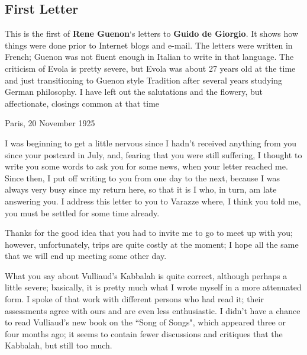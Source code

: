 \subsection{First Letter}

\begin{quotex}
This is the first of \textbf{Rene Guenon}`s letters to \textbf{Guido de Giorgio}. It shows how things were done prior to Internet blogs and e-mail. The letters were written in French; Guenon was not fluent enough in Italian to write in that language. The criticism of Evola is pretty severe, but Evola was about 27 years old at the time and just transitioning to Guenon style Tradition after several years studying German philosophy. I have left out the salutations and the flowery, but affectionate, closings common at that time
\end{quotex}

Paris, 20 November 1925

I was beginning to get a little nervous since I hadn't received anything from you since your postcard in July, and, fearing that you were still suffering, I thought to write you some words to ask you for some news, when your letter reached me. Since then, I put off writing to you from one day to the next, because I was always very busy since my return here, so that it is I who, in turn, am late answering you. I address this letter to you to Varazze where, I think you told me, you must be settled for some time already.

Thanks for the good idea that you had to invite me to go to meet up with you; however, unfortunately, trips are quite costly at the moment; I hope all the same that we will end up meeting some other day.

What you say about Vulliaud's Kabbalah is quite correct, although perhaps a little severe; basically, it is pretty much what I wrote myself in a more attenuated form. I spoke of that work with different persons who had read it; their assessments agree with ours and are even less enthusiastic. I didn't have a chance to read Vulliaud's new book on the ``Song of Songs", which appeared three or four months ago; it seems to contain fewer discussions and critiques that the Kabbalah, but still too much.

